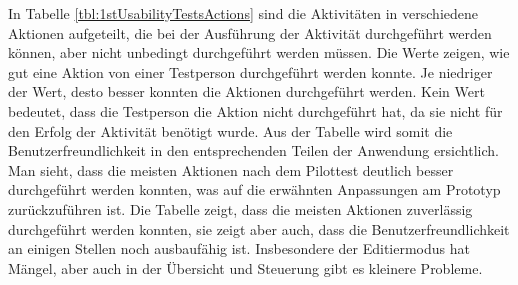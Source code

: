 In Tabelle \ref{tbl:1stUsabilityTestsActions} sind die Aktivitäten in verschiedene Aktionen aufgeteilt, die bei der Ausführung der Aktivität durchgeführt werden können, aber nicht unbedingt durchgeführt werden müssen. Die Werte zeigen, wie gut eine Aktion von einer Testperson durchgeführt werden konnte. Je niedriger der Wert, desto besser konnten die Aktionen durchgeführt werden. Kein Wert bedeutet, dass die Testperson die Aktion nicht durchgeführt hat, da sie nicht für den Erfolg der Aktivität benötigt wurde. Aus der Tabelle wird somit die Benutzerfreundlichkeit in den entsprechenden Teilen der Anwendung ersichtlich. Man sieht, dass die meisten Aktionen nach dem Pilottest deutlich besser durchgeführt werden konnten, was auf die erwähnten Anpassungen am Prototyp zurückzuführen ist. Die Tabelle zeigt, dass die meisten Aktionen zuverlässig durchgeführt werden konnten, sie zeigt aber auch, dass die Benutzerfreundlichkeit an einigen Stellen noch ausbaufähig ist. Insbesondere der Editiermodus hat Mängel, aber auch in der Übersicht und Steuerung gibt es kleinere Probleme.


